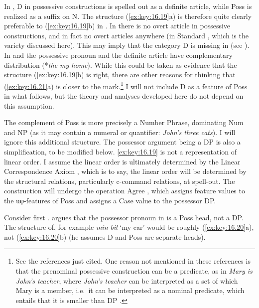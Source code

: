 \documentclass[output=paper]{langsci/langscibook}
\begin{document}
In , D in possessive constructions is spelled out as a definite
article, while Poss is realized as a suffix on N. The structure (\ref{ex:key:16.19}a) is
therefore quite clearly preferable to (\ref{ex:key:16.19}b) in .  In  there is
no overt article in possessive constructions, and in fact no overt articles
anywhere (in Standard , which is the variety discussed here). This may
imply that the category D is missing in  (see \citealt{Boskovic:2009}).
In  and  the possessive pronoun and the definite article have
complementary distribution (*\emph{the my home}). While this could be taken as
evidence that the structure (\ref{ex:key:16.19}b) is right, there are other
reasons for thinking that (\ref{ex:key:16.21}a) is closer to the
mark.\footnote{See the references just cited. One reason not mentioned in
    these references is that the pre\-nominal possessive construction can be a
    predicate, as in \emph{Mary is John’s teacher}, where \emph{John’s teacher}
    can be interpreted as a set of which Mary is a member, i.e.\ it can be
    interpreted as a nominal predicate, which entails that it is smaller than
    DP \citep{Holmberg1993}.} I will not include D as a feature of Poss in what
    follows, but the theory and analyses developed here do not depend on this
    assumption.

The complement of Poss is more precisely a Number Phrase, dominating Num and NP
(as it may contain a numeral or quantifier: \emph{John’s three cats}). I will
ignore this additional structure. The possessor argument being a DP is also a
simplification, to be modified below. \eqref{ex:key:16.19} is not a representation of linear
order. I assume the linear order is ultimately determined by the Linear
Correspondence Axiom  \citep{Kayne1994}, which is to say, the linear order will
be determined by the structural relations, particularly c-command relations, at
spell-out. The construction will undergo the operation Agree
\citep{Chomsky2001}, which assigns feature values to the uφ-features of
Poss and assigns a Case value to the possessor DP.

Consider first . \textcite{Delsing1993,Delsing1998} argues that
the possessor pronoun in  is a Poss head, not a DP. The structure
of, for example \emph{min bil} `my car' would be roughly (\ref{ex:key:16.20}a),
not (\ref{ex:key:16.20}b) (he assumes D and Poss are separate heads).
\end{document}
